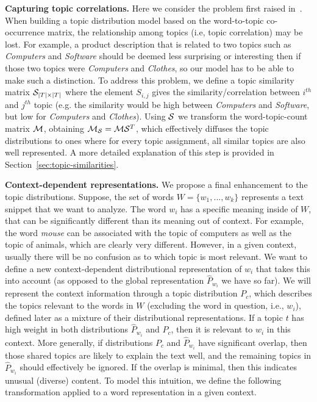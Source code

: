  {\bf Capturing topic correlations.} Here we consider the problem
first raised in~\cite{bache:2013}. When building a topic
distribution model based on the word-to-topic co-occurrence matrix,
the relationship among topics 
(i.e, topic correlation) may be lost. 
For example, a product description that is related to two
topics such as {\em Computers} and {\em Software} should be deemed
less surprising or interesting then if those two topics were {\em
  Computers} and {\em Clothes}, so our model has to be able to make
such a distinction.
To address this problem, we define a topic similarity
matrix ${\mathcal S}_{|T|\times|T|}$ 
where the element $S_{i,j}$ gives the similarity/correlation between
$i^{th}$ and $j^{th}$ topic (e.g. the similarity would be high between {\em
  Computers} and {\em Software}, but low for {\em Computers} and
{\em Clothes}). Using
${\mathcal S}$ we transform the word-topic-count matrix ${\mathcal M}$, obtaining
${\mathcal M}_{\mathcal S} = {\mathcal M}{\mathcal S}^T$, which effectively diffuses the topic
distributions to ones where for every topic assignment, all similar topics are
also well represented. A more detailed explanation of this step is provided
in Section~\ref{sec:topic-similarities}.

{\bf Context-dependent representations.} We propose a final
enhancement to the topic 
distributions. Suppose, the set of words $W=\{w_1,...,w_k\}$
represents a text snippet that we want to analyze. The word $w_i$ has
a specific meaning inside of $W$, that can be significantly different
than its meaning out of context. For example, the word {\em mouse} can
be associated with the topic of computers as well as the topic of
animals, which are clearly very different. However, in a given
context, usually there will be no confusion as to which topic is
most relevant. We want to define a new context-dependent
distributional representation of $w_i$ that takes this into account
(as opposed to the global representation $\widehat{P}_{w_i}$ we have so far).
We will represent the context information through a topic
distribution $P_c$, which describes the
topics relevant to the words in $W$ (excluding the word in question, i.e., $w_i$), defined later as a mixture of
their distributional representations. If a topic $t$ has high weight in
both distributions $\widehat{P}_{w_i}$ and $P_c$, then it is relevant to $w_i$ in this
context. More generally, if distributions $P_c$ and $\widehat{P}_{w_i}$ have
significant overlap, then those shared topics are likely to explain the
text well, and the remaining topics in $\widehat{P}_{w_i}$ should effectively be
ignored. If the overlap is minimal, then this indicates unusual
(diverse) content. To model this intuition, we define the following
transformation applied to a word representation in a given context.

